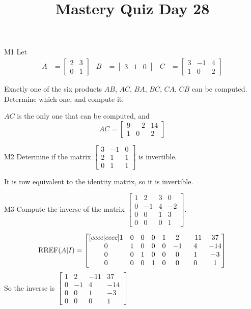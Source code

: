 \documentclass{sbgLAquiz}
\title{Mastery Quiz Day 28 }
\begin{document}
\begin{problem}{M1}
Let 
\begin{align*}
A &= \begin{bmatrix} 2 & 3 \\ 0 & 1 \end{bmatrix} & B&= \begin{bmatrix} 3 & 1 & 0 \end{bmatrix} & C&= \begin{bmatrix} 3 & -1 & 4 \\ 1 & 0 & 2 \end{bmatrix}
\end{align*}

Exactly one of the six products $AB$, $AC$, $BA$, $BC$, $CA$, $CB$ can be computed.  Determine which one, and compute it.
\end{problem}
\begin{solution}
$AC$ is the only one that can be computed, and 
$$AC = \begin{bmatrix} 9 & -2 & 14 \\ 1 & 0 & 2 \end{bmatrix}$$
\end{solution}


\begin{problem}{M2}
Determine if the matrix $\begin{bmatrix} 3 & -1 & 0  \\ 2 & 1 & 1  \\ 0 & 1 & 1   \end{bmatrix}$ is invertible.
\end{problem}
\begin{solution}
It is row equivalent to the identity matrix, so it is invertible.
\end{solution}


\begin{extract}\newpage\end{extract}
\begin{problem}{M3}
Compute the inverse of the matrix $\begin{bmatrix} 1 & 2 & 3 & 0 \\ 0 & -1 & 4 & -2 \\ 0 & 0 & 1 & 3 \\ 0 & 0 & 0 & 1 \end{bmatrix}$.
\end{problem}
\begin{solution}
$$\operatorname{RREF}(A|I) = \begin{bmatrix}[cccc|cccc] 1 & 0 & 0 &0 & 1 & 2 & -11 & 37 \\ 0 & 1 & 0 & 0 & 0 & -1 & 4 & -14 \\ 0 & 0 & 1 & 0 & 0 & 0 & 1 & -3 \\ 0 & 0 & 0 & 1 & 0 & 0 & 0 & 1 \end{bmatrix}$$
So the inverse is $\begin{bmatrix}  1 & 2 & -11 & 37 \\ 0 & -1 & 4 & -14 \\  0 & 0 & 1 & -3 \\ 0 & 0 & 0 & 1 \end{bmatrix}$
\end{solution}
\end{document}
